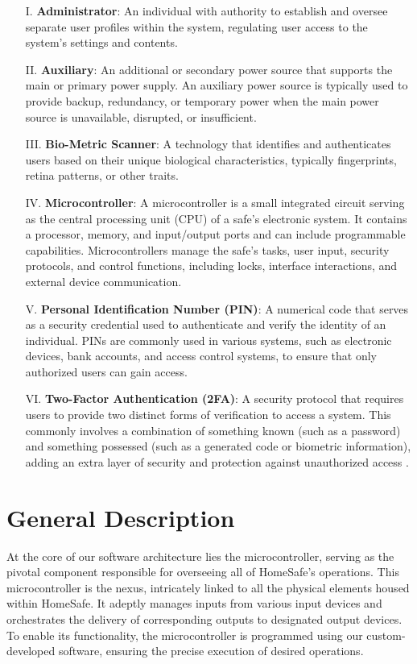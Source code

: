 \documentclass{article}
\begin{document}
\begin{enumerate}
    \item[I.] \textbf{Administrator}: An individual with authority to establish and oversee separate user profiles within the system, regulating user access to the system's settings and contents.
    \item[II.] \textbf{Auxiliary}: An additional or secondary power source that supports the main or primary power supply. An auxiliary power source is typically used to provide backup, redundancy, or temporary power when the main power source is unavailable, disrupted, or insufficient.
    \item[III.] \textbf{Bio-Metric Scanner}: A technology that identifies and authenticates users based on their unique biological characteristics, typically fingerprints, retina patterns, or other traits.
    \item[IV.] \textbf{Microcontroller}: A microcontroller is a small integrated circuit serving as the central processing unit (CPU) of a safe's electronic system. It contains a processor, memory, and input/output ports and can include programmable capabilities. Microcontrollers manage the safe's tasks, user input, security protocols, and control functions, including locks, interface interactions, and external device communication.
    \item[V.] \textbf{Personal Identification Number (PIN)}: A numerical code that serves as a security credential used to authenticate and verify the identity of an individual. PINs are commonly used in various systems, such as electronic devices, bank accounts, and access control systems, to ensure that only authorized users can gain access.
    \item[VI.] \textbf{Two-Factor Authentication (2FA)}: A security protocol that requires users to provide two distinct forms of verification to access a system. This commonly involves a combination of something known (such as a password) and something possessed (such as a generated code or biometric information), adding an extra layer of security and protection against unauthorized access \cite{identityautomationTwoFactorAuthentication}.
\end{enumerate}

\section{General Description}
At the core of our software architecture lies the microcontroller, serving as the pivotal component responsible for overseeing all of HomeSafe's operations. This microcontroller is the nexus, intricately linked to all the physical elements housed within HomeSafe. It adeptly manages inputs from various input devices and orchestrates the delivery of corresponding outputs to designated output devices. To enable its functionality, the microcontroller is programmed using our custom-developed software, ensuring the precise execution of desired operations.
\end{document}
